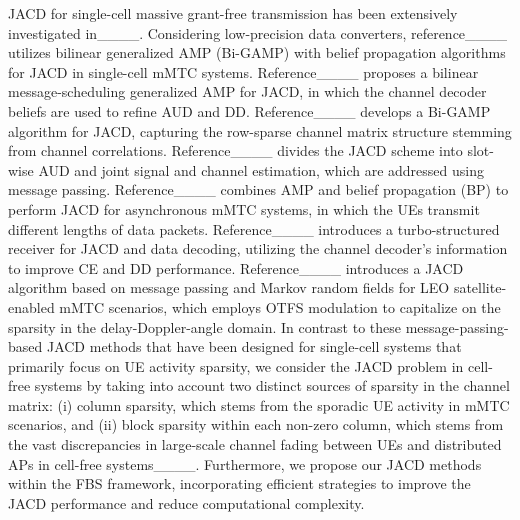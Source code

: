 JACD for single-cell massive grant-free transmission has been extensively investigated in____.
%
Considering low-precision data converters, reference____ utilizes bilinear generalized AMP (Bi-GAMP) with belief propagation algorithms for JACD in single-cell mMTC systems.
%
Reference____ proposes a bilinear message-scheduling generalized AMP for JACD, in which the channel decoder beliefs are used to refine AUD and DD.
%
Reference____ develops a Bi-GAMP algorithm for JACD,  capturing the row-sparse channel matrix structure stemming from channel correlations.
%
Reference____ divides the JACD scheme into slot-wise AUD and joint signal and channel estimation, which are addressed using message passing.
%
Reference____ combines AMP and belief propagation (BP) to perform JACD for asynchronous mMTC systems, in which the UEs transmit different lengths of data packets.
%
Reference____ introduces a turbo-structured receiver for JACD and data decoding, utilizing the channel decoder's information to improve CE and DD performance.
%
Reference____ introduces a JACD algorithm based on message passing and Markov random fields for LEO satellite-enabled mMTC scenarios, which employs OTFS modulation to capitalize on the sparsity in the delay-Doppler-angle domain.
%
In contrast to these message-passing-based JACD methods that have been designed for single-cell systems that primarily focus on UE activity sparsity, we consider the JACD problem in cell-free systems by taking into account two distinct sources of sparsity in the channel matrix: (i) column sparsity, which stems from the sporadic UE activity in mMTC scenarios, and (ii) block sparsity within each non-zero column, which stems from the vast discrepancies in large-scale channel fading between UEs and distributed APs in cell-free systems____. 
%
Furthermore, we propose our JACD methods within the FBS framework, incorporating efficient strategies to improve the JACD performance and reduce computational complexity.


